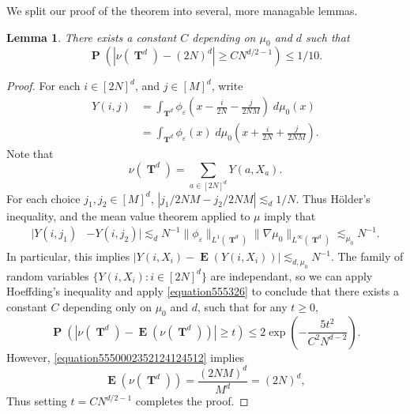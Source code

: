\documentclass[12pt,reqno]{article}
\DeclareMathOperator{\TT}{\mathbf{T}}
\newtheorem{lemma}[theorem]{Lemma}
\DeclareMathOperator{\EE}{\mathbf{E}}
\DeclareMathOperator{\PP}{\mathbf{P}}
\begin{document}
We split our proof of the theorem into several, more managable lemmas.

\begin{lemma} \label{nuboundlemma}
    There exists a constant $C$ depending on $\mu_0$ and $d$ such that
    \[ \PP \left( |\nu(\TT^d) - (2N)^d | \geq C N^{d/2 - 1} \right) \leq 1/10. \]
\end{lemma}
\begin{proof}
    For each $i \in [2N]^d$, and $j \in [M]^d$, write
    \begin{equation}
    \begin{split}
        Y(i,j) &= \int_{\TT^d} \phi_\varepsilon \left( x - \frac{i}{2N} - \frac{j}{2NM} \right)\; d\mu_0(x)\\
        &= \int_{\TT^d} \phi_\varepsilon(x)\; d\mu_0 \left(x + \frac{i}{2N} + \frac{j}{2NM} \right).
    \end{split}
    \end{equation}
    Note that
    \begin{equation} \label{equation555326}
        \nu(\TT^d) = \sum_{a \in [2N]^d} Y(a,X_a).
    \end{equation}
    For each choice $j_1, j_2 \in [M]^d$, $|j_1/2NM - j_2/2NM| \lesssim_d 1/N$. Thus H\"{o}lder's inequality, and the mean value theorem applied to $\mu$ imply that
    \begin{equation} \label{equation774435}
    \begin{split}
        |Y(i,j_1) &- Y(i,j_2)| \lesssim_d N^{-1} \| \phi_\varepsilon \|_{L^1(\TT^d)} \| \nabla \mu_0 \|_{L^\infty(\TT^d)} \lesssim_{\mu_0} N^{-1}.
    \end{split}
    \end{equation}
    In particular, this implies $|Y(i,X_i) - \EE(Y(i,X_i))| \lesssim_{d,\mu_0} N^{-1}$. The family of random variables $\{ Y(i,X_i) : i \in [2N]^d \}$ are independant, so we can apply Hoeffding's inequality and apply \eqref{equation555326} to conclude that there exists a constant $C$ depending only on $\mu_0$ and $d$, such that for any $t \geq 0$,
    \begin{equation} \label{equation6653921}
        \PP \left( |\nu(\TT^d) - \EE(\nu(\TT^d))| \geq t \right) \leq 2 \exp \left( - \frac{5 t^2}{C^2 N^{d-2}} \right).
    \end{equation}
    However, \eqref{equation5550002352124124512} implies
    \begin{equation} \label{equation9102490120}
        \EE(\nu(\TT^d)) = \frac{(2NM)^d}{M^d} = (2N)^d,
    \end{equation}
    Thus setting $t = C N^{d/2 - 1}$ completes the proof.
\end{proof}
\end{document}

